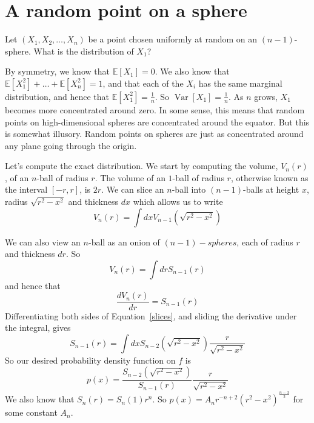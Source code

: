 \documentclass{article}
\newcommand\bbe{\mathbb{E}}
\newcommand\var{\mathop{\mathrm{Var}}}
\begin{document}
\section{A random point on a sphere}
Let $(X_1,X_2,\ldots,X_n)$ be a point chosen uniformly at random on an $(n-1)$-sphere.
What is the distribution of $X_1$?

By symmetry, we know that $\bbe[X_1]=0$.
We also know that $\bbe[X_1^2]+\ldots+\bbe[X_n^2]=1$, and that each of the $X_i$ has the same marginal distribution, and hence that $\bbe[X_1^2]=\frac{1}{n}$.
So $\var[X_1]=\frac{1}{n}$.
As $n$ grows, $X_1$ becomes more concentrated around zero.
In some sense, this means that random points on high-dimensional spheres are concentrated around the equator.
But this is somewhat illusory.
Random points on spheres are just as concentrated around any plane going through the origin.

Let's compute the exact distribution.
We start by computing the volume, $V_n(r)$, of an $n$-ball of radius $r$.
The volume of an $1$-ball of radius $r$, otherwise known as the interval $[-r, r]$, is $2r$.
We can slice an $n$-ball into $(n-1)$-balls at height $x$, radius $\sqrt{r^2-x^2}$ and thickness $dx$ which allows us to write
\begin{equation}
V_n(r) = \int dx V_{n-1}(\sqrt{r^2-x^2})
\label{slices}
\end{equation}

We can also view an $n$-ball as an onion of $(n-1)-spheres$, each of radius $r$ and thickness $dr$.
So
\[
V_n(r) = \int dr S_{n-1}(r)
\]
and hence that
\[
\frac{dV_n(r)}{dr} = S_{n-1}(r)
\]
Differentiating both sides of Equation~\ref{slices}, and sliding the derivative under the integral, gives
\[
S_{n-1}(r) = \int dx S_{n-2}(\sqrt{r^2-x^2})\frac{r}{\sqrt{r^2-x^2}}
\]
So our desired probability density function on $f$ is
\[
p(x) = \frac{S_{n-2}(\sqrt{r^2-x^2})}{S_{n-1}(r)}\frac{r}{\sqrt{r^2-x^2}}
\]
We also know that $S_n(r)=S_n(1)r^n$.
So $p(x) = A_n r^{-n+2}(r^2-x^2)^\frac{n-3}{2}$ for some constant $A_n$.
\end{document}
